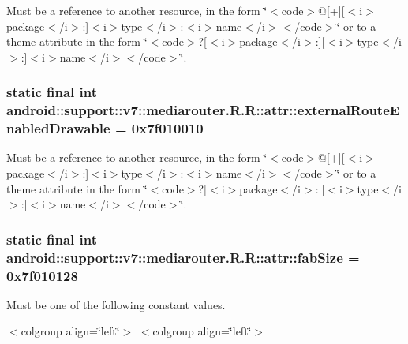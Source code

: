 Must be a reference to another resource, in the form \char`\"{}$<$code$>$@\mbox{[}+\mbox{]}\mbox{[}$<$i$>$package$<$/i$>$:\mbox{]}$<$i$>$type$<$/i$>$:$<$i$>$name$<$/i$>$$<$/code$>$\char`\"{} or to a theme attribute in the form \char`\"{}$<$code$>$?\mbox{[}$<$i$>$package$<$/i$>$:\mbox{]}\mbox{[}$<$i$>$type$<$/i$>$:\mbox{]}$<$i$>$name$<$/i$>$$<$/code$>$\char`\"{}. \hypertarget{classandroid_1_1support_1_1v7_1_1mediarouter_1_1_r_1_1attr_8a6ee67b17e5dfbd63d517b26507cbe0}{
\subsubsection[{externalRouteEnabledDrawable}]{\setlength{\rightskip}{0pt plus 5cm}static final int android::support::v7::mediarouter.R.R::attr::externalRouteEnabledDrawable = 0x7f010010}}
\label{classandroid_1_1support_1_1v7_1_1mediarouter_1_1_r_1_1attr_8a6ee67b17e5dfbd63d517b26507cbe0}


Must be a reference to another resource, in the form \char`\"{}$<$code$>$@\mbox{[}+\mbox{]}\mbox{[}$<$i$>$package$<$/i$>$:\mbox{]}$<$i$>$type$<$/i$>$:$<$i$>$name$<$/i$>$$<$/code$>$\char`\"{} or to a theme attribute in the form \char`\"{}$<$code$>$?\mbox{[}$<$i$>$package$<$/i$>$:\mbox{]}\mbox{[}$<$i$>$type$<$/i$>$:\mbox{]}$<$i$>$name$<$/i$>$$<$/code$>$\char`\"{}. \hypertarget{classandroid_1_1support_1_1v7_1_1mediarouter_1_1_r_1_1attr_e6b835902f55f8030ed414c4e81ceb46}{
\subsubsection[{fabSize}]{\setlength{\rightskip}{0pt plus 5cm}static final int android::support::v7::mediarouter.R.R::attr::fabSize = 0x7f010128}}
\label{classandroid_1_1support_1_1v7_1_1mediarouter_1_1_r_1_1attr_e6b835902f55f8030ed414c4e81ceb46}


Must be one of the following constant values. \begin{TabularC}{0}
\hline
\end{TabularC}
$<$colgroup align=\char`\"{}left\char`\"{}$>$ $<$colgroup align=\char`\"{}left\char`\"{}$>$ 

